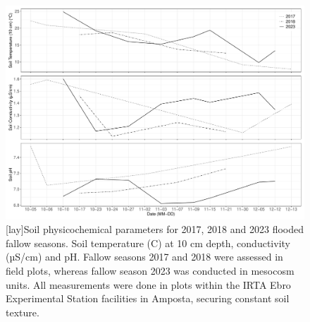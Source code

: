 
\begin{figure} [ht]
\captionsetup{justification=justified}
	\centering 
	\includegraphics[scale=0.47, center]{Figures/Chapter_2/Meso_vs_Field_Plot.pdf}
	[lay]{Soil physicochemical parameters for 2017, 2018 and 2023 flooded fallow seasons. Soil temperature (\degree C) at 10 cm depth, conductivity (µS/cm) and pH. Fallow seasons 2017 and 2018 were assessed in field plots, whereas fallow season 2023 was conducted in mesocosm units. All measurements were done in plots within the IRTA Ebro Experimental Station facilities in Amposta, securing constant soil texture.}  
	\label{meso_field}
\end{figure}

%

\renewcommand{\thefigure}{\thechapter.\arabic{figure}}
\setcounter{figure}{0}

\renewcommand{\thetable}{\thechapter.\arabic{table}}
\setcounter{table}{0}
